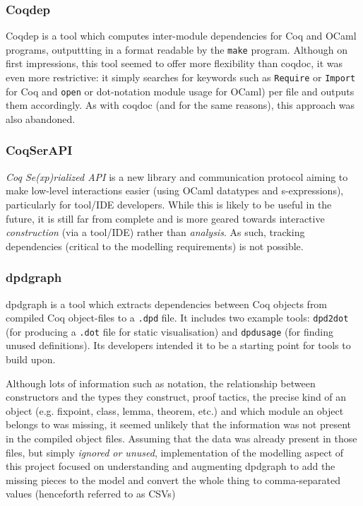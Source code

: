 \subsubsection{Coqdep}
Coqdep is a tool which computes inter-module dependencies for Coq and
OCaml programs, outputtting in a format readable by the \texttt{make} program.
Although on first impressions, this tool seemed to offer more flexibility than
coqdoc, it was even more restrictive: it simply searches for keywords such as
\texttt{Require} or \texttt{Import} for Coq  and \texttt{open} or dot-notation
module usage for OCaml) per file and outputs them accordingly.  As with coqdoc
(and for the same reasons), this approach was also abandoned.

\subsubsection{CoqSerAPI}

\emph{Coq Se(xp)rialized API} is a new library and communication protocol aiming to
make low-level interactions easier (using OCaml datatypes and s-expressions),
particularly for tool/IDE developers. While this is likely to be useful in the
future, it is still far from complete and is more geared towards interactive
\emph{construction} (via a tool/IDE) rather than \emph{analysis}. As such,
tracking dependencies (critical to the modelling requirements) is not possible.

\subsubsection{dpdgraph}

dpdgraph is a tool which extracts dependencies between Coq objects from compiled
Coq object-files to a \texttt{.dpd} file. It includes two example tools:
\texttt{dpd2dot} (for producing a \texttt{.dot} file for static visualisation)
and \texttt{dpdusage} (for finding unused definitions). Its developers intended
it to be a starting point for tools to build upon.

Although lots of information such as notation, the relationship between
constructors and the types they construct, proof tactics, the precise kind of an
object (e.g.  fixpoint, class, lemma, theorem, etc.) and which module an object
belongs to was missing, it seemed unlikely that the information was not present
in the compiled object files. Assuming that the data was already present in
those files, but simply \emph{ignored or unused}, implementation of the
modelling aspect of this project focused on understanding and augmenting
dpdgraph to add the missing pieces to the model and convert the whole thing to
comma-separated values (henceforth referred to as CSVs)

